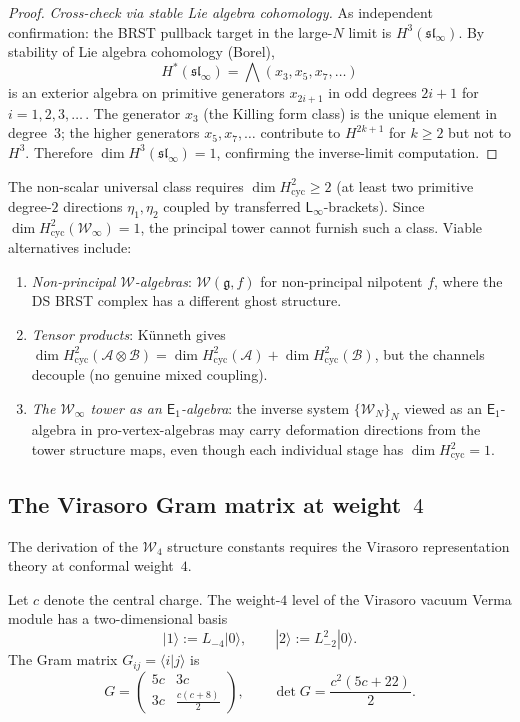 \documentclass[11pt]{article}
\newcommand{\cA}{\mathcal{A}}
\newcommand{\cB}{\mathcal{B}}
\newcommand{\cW}{\mathcal{W}}
\newcommand{\fg}{\mathfrak{g}}
\newcommand{\fsl}{\mathfrak{sl}}
\newcommand{\Eone}{\mathsf{E}_1}
\newcommand{\Linf}{\mathsf{L}_{\infty}}
\begin{document}
\begin{proof}
\medskip
\noindent\emph{Cross-check via stable Lie algebra cohomology.}
As independent confirmation: the BRST pullback target in the
large-$N$ limit is $H^3(\fsl_\infty)$.  By stability of Lie
algebra cohomology (Borel),
\[
H^*(\fsl_\infty) = \bigwedge(x_3, x_5, x_7, \ldots)
\]
is an exterior algebra on primitive generators $x_{2i+1}$ in odd
degrees $2i+1$ for $i = 1, 2, 3, \ldots$\,.
The generator $x_3$ (the Killing form class) is the unique
element in degree~$3$; the higher generators $x_5, x_7, \ldots$
contribute to $H^{2k+1}$ for $k \geq 2$ but not to $H^3$.
Therefore $\dim H^3(\fsl_\infty) = 1$, confirming the inverse-limit
computation.
\end{proof}

\begin{remark}
The non-scalar universal class requires
$\dim H^2_{\mathrm{cyc}} \geq 2$ (at least two primitive degree-$2$
directions $\eta_1, \eta_2$ coupled by transferred $\Linf$-brackets).
Since $\dim H^2_{\mathrm{cyc}}(\cW_\infty) = 1$, the principal tower
cannot furnish such a class.  Viable alternatives include:
\begin{enumerate}[label=(\alph*)]
\item \emph{Non-principal $\cW$-algebras}: $\cW(\fg, f)$ for
  non-principal nilpotent $f$, where the DS BRST complex has
  a different ghost structure.
\item \emph{Tensor products}: K\"unneth gives
  $\dim H^2_{\mathrm{cyc}}(\cA \otimes \cB) = \dim H^2_{\mathrm{cyc}}(\cA) + \dim H^2_{\mathrm{cyc}}(\cB)$,
  but the channels decouple (no genuine mixed coupling).
\item \emph{The $\cW_\infty$ tower as an $\Eone$-algebra}:
  the inverse system $\{\cW_N\}_N$ viewed as an $\Eone$-algebra
  in pro-vertex-algebras may carry deformation directions from
  the tower structure maps, even though each individual stage
  has $\dim H^2_{\mathrm{cyc}} = 1$.
\end{enumerate}
\end{remark}


\subsection{The Virasoro Gram matrix at weight~$4$}

The derivation of the $\cW_4$ structure constants requires the
Virasoro representation theory at conformal weight~$4$.

\begin{proposition}\label{prop:gram-wt4}
Let $c$ denote the central charge.  The weight-$4$ level of the
Virasoro vacuum Verma module has a two-dimensional basis
\[
|1\rangle := L_{-4}|0\rangle, \qquad
|2\rangle := L_{-2}^2|0\rangle.
\]
The Gram matrix $G_{ij} = \langle i | j \rangle$ is
\[
G = \begin{pmatrix} 5c & 3c \\ 3c & \frac{c(c+8)}{2} \end{pmatrix},
\qquad
\det G = \frac{c^2(5c+22)}{2}.
\]
\end{proposition}
\end{document}
